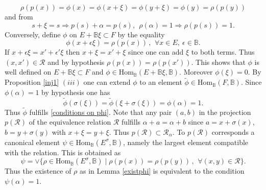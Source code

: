 \documentclass[12pt]{article}
\def\Hom{{\rm Hom}}
\def\B{{\mathbb B}}
\def\cR{{\mathcal R}}
\def\qqq{\,,\,~\forall}
\def\Hom {{\mbox{Hom}}}
\begin{document}
$$
\rho(p(x))=\phi(x)=\phi(x+\xi)=\phi(y+\xi)=\phi(y)=\rho(p(y))
$$
and from
$$
s+\xi=s\Rightarrow p(s)+\alpha=p(s), \ \ \rho(\alpha)=1 \Rightarrow \rho(p(s))=1.
$$
Conversely, define $\phi$ on $E+\B\xi\subset F$ by the equality
 $$
 \phi(x+\epsilon \xi)=\rho(p(x))\qqq x\in E,  \ \epsilon \in \B.
 $$
If $x+\epsilon\xi=x'+\epsilon'\xi$ then $x+\xi=x'+\xi$ since one can add $\xi$ to both terms. Thus $(x,x')\in \cR$ and by hypothesis $\rho(p(x))=\rho(p(x'))$. This shows that $\phi$ is well defined on $E+\B\xi\subset F$ and $\phi\in \Hom_\B(E+\B\xi,\B)$. Moreover $\phi(\xi)=0$.  By Proposition \ref{inj1} $(iii)$ one can extend $\phi$ to an element $\tilde \phi\in \Hom_\B(F,\B)$. Since $\phi(\alpha)=1$ by hypothesis one has $$
\tilde\phi(\sigma(\xi))=\tilde\phi(\xi+\sigma(\xi))=\phi(\alpha)=1.
$$
 Thus $\tilde \phi$ fulfills \eqref{conditions on phi}.\endproof 
 Note that any pair $(a,b)$ in the projection $p(\cR)$ of the equivalence relation $\cR$ fulfills $\alpha+a=\alpha+b$ since $a=x+\sigma(x)$, $b=y+\sigma(y)$ with $x+\xi=y+\xi$. 
 Thus $p(\cR)\subset \cR_\alpha$. To $p(\cR)$ corresponds a canonical element $\psi\in \Hom_\B(E^\sigma,\B)$, namely the largest element compatible with the relation. This is obtained as $$\psi=\vee\{\rho\in \Hom_\B(E^\sigma,\B)\mid \rho(p(x))=\rho(p(y))\qqq (x,y)\in \cR\}.$$ Thus the existence of $\rho$ as in Lemma \ref{existphi} is equivalent to the condition $\psi(\alpha)=1$.
\end{document}
